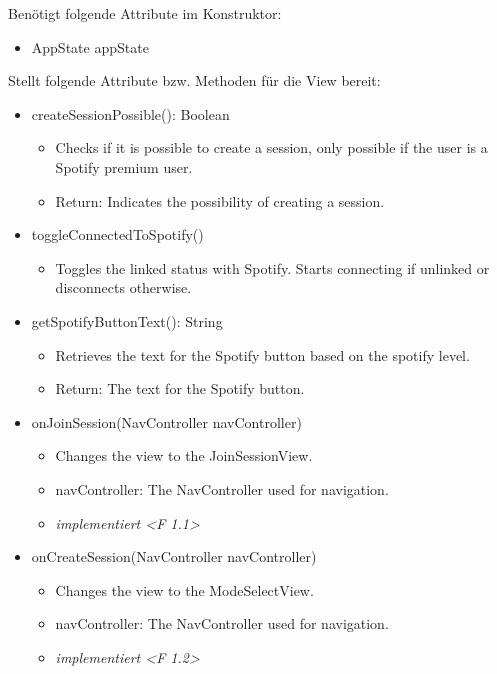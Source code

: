 \documentclass[oneside, ngerman]{sdqtechreport}
\begin{document}
Benötigt folgende Attribute im Konstruktor:
\begin{itemize}
    \item AppState appState
\end{itemize}
Stellt folgende Attribute bzw. Methoden für die View bereit:
\begin{itemize}

    \item createSessionPossible(): Boolean
        \begin{itemize}
            \item Checks if it is possible to create a session, only possible if the user is a Spotify premium user.
            \item Return: Indicates the possibility of creating a session.
        \end{itemize}
    \item toggleConnectedToSpotify()
        \begin{itemize}
            \item Toggles the linked status with Spotify. Starts connecting if unlinked or disconnects otherwise.
        \end{itemize}
    \item getSpotifyButtonText(): String
        \begin{itemize}
            \item Retrieves the text for the Spotify button based on the spotify level.
            \item Return: The text for the Spotify button.
        \end{itemize}
    \item onJoinSession(NavController navController)
        \begin{itemize}
            \item Changes the view to the JoinSessionView.
            \item navController: The NavController used for navigation.
            \item \textit{implementiert <F 1.1>}
        \end{itemize}
    \item onCreateSession(NavController navController)
        \begin{itemize}
            \item Changes the view to the ModeSelectView.
            \item navController: The NavController used for navigation.
            \item \textit{implementiert <F 1.2>}

\end{itemize}
\end{itemize}
\end{document}
